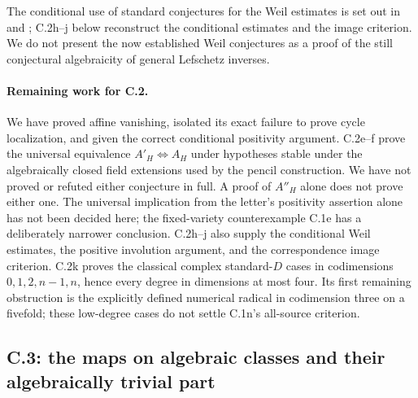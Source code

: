 The conditional use of standard conjectures for the Weil estimates is
set out in \citet[Sections 2--4]{cyGrothendieck1969} and
\citet[Propositions 3.6, 3.8 and Corollary 3.9]{cyKleiman1968};
C.2h--j below reconstruct the conditional estimates and the image
criterion. We do not present the now established Weil conjectures as a proof
of the still conjectural algebraicity of general Lefschetz inverses.




\paragraph{Remaining work for C.2.}
We have proved affine vanishing, isolated its exact failure to prove
cycle localization, and given the correct conditional positivity
argument. C.2e--f prove the universal equivalence
$A'_H\Longleftrightarrow A_H$ under hypotheses stable under the
algebraically closed field extensions used by the pencil construction.
We have not proved or refuted either conjecture in full.
A proof of $A''_H$ alone does not prove either one.
The universal implication from the letter's
positivity assertion alone has not been decided here; the fixed-variety
counterexample C.1e has a deliberately narrower conclusion.
C.2h--j also supply the conditional Weil estimates, the positive
involution argument, and the correspondence image criterion.
C.2k proves the classical complex standard-$D$ cases in
codimensions $0,1,2,n-1,n$, hence every degree in dimensions
at most four. Its first remaining obstruction is the explicitly
defined numerical radical in codimension three on a fivefold;
these low-degree cases do not settle C.1n's all-source criterion.

\subsection{C.3: the maps on algebraic classes and their algebraically trivial part}

